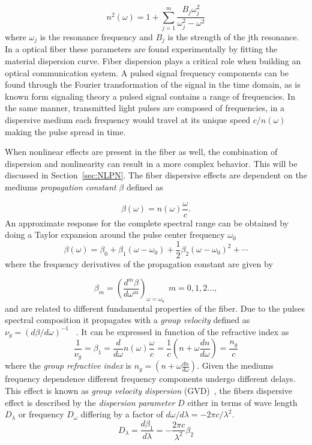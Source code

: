 \begin{equation}
n^2(\omega)=1+\sum^m_{j=1}\frac{B_j\omega^2_j}{\omega^2_j-\omega^2}
\end{equation}
 where $\omega_j$ is the resonance frequency and $B_j$ is the strength of the jth resonance. In a optical fiber these parameters are found experimentally by fitting the material dispersion curve. Fiber dispersion plays a critical role when building an optical communication system. A pulsed signal frequency components can be found through the Fourier transformation of the signal in the time domain, as is known form signaling theory a pulsed signal contains a range of frequencies. In the same manner, transmitted light pulses are composed of frequencies, in a dispersive medium each frequency would travel at its unique speed $c/n(\omega)$ making the pulse spread in time.
 
 When nonlinear effects are present in the fiber as well, the combination of dispersion and nonlinearity can result in a more complex behavior. This will be discussed in Section~\ref{sec:NLPN}. The fiber dispersive effects are dependent on the mediums \textit{propagation constant} $\beta$ defined as 
 

\begin{equation}
\beta(\omega)=n(\omega)\frac{\omega}{c}.
\end{equation}
An approximate response for the complete spectral range can be obtained by doing a Taylor expansion around the pulse center frequency $\omega_0$
\begin{equation}
\beta(\omega)=\beta_0+\beta_1(\omega-\omega_0)+\frac{1}{2}\beta_2(\omega-\omega_0)^2+\dotsm
\end{equation}
where the frequency derivatives of the propagation constant are given by 

 \begin{equation}
\beta_m=\left(\frac{d^m\beta}{d\omega^m}\right)_{\omega=\omega_0} \ \  m=0,1,2...,
\end{equation}
and are related to different fundamental properties of the fiber. Due to the pulses spectral composition it propagates with a \emph{group velocity}  defined as $\nu_g=(d\beta/d\omega)^{-1}$ ~\cite{born2013principles}. It can be expressed in function of the refractive index  as
\begin{equation}
\frac{1}{\nu_g}=\beta_1=\frac{d}{d\omega}n(\omega)\frac{\omega}{c}=\frac{1}{c}\left(n+\omega\frac{dn}{d\omega}\right)=\frac{n_g}{c}\label{eq:beta1}
\end{equation}
where the \emph{group refractive index} is $n_g=\left(n+\omega\frac{dn}{d\omega}\right)$. Given the mediums frequency dependence different frequency components undergo different delays. This effect is known as \textit{group velocity dispersion} (GVD)~\cite{agrawal2000nonlinear}, the fibers dispersive effect  is described by the \emph{dispersion parameter} $D$ either in terms of wave length $D_\lambda$  or frequency  $D_\omega$ differing by a factor of $d\omega/d\lambda=-2\pi c /\lambda^2$. 
\begin{equation}
D_\lambda=\frac{d\beta_1}{d\lambda}=-\frac{2\pi c}{\lambda^2}\beta_2
\end{equation}

